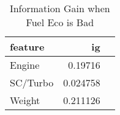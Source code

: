 
\begin{table}[!htp]\centering
    \caption{Information Gain when Fuel Eco is Bad}\label{ig:fuel-eco_bad}
    \scriptsize
    \begin{tabular}{lrr}\toprule
        \textbf{feature} & \textbf{ig} \\\midrule
        Engine           & 0.19716     \\
        SC/Turbo         & 0.024758    \\
        Weight           & 0.211126    \\
        \bottomrule
    \end{tabular}
\end{table}